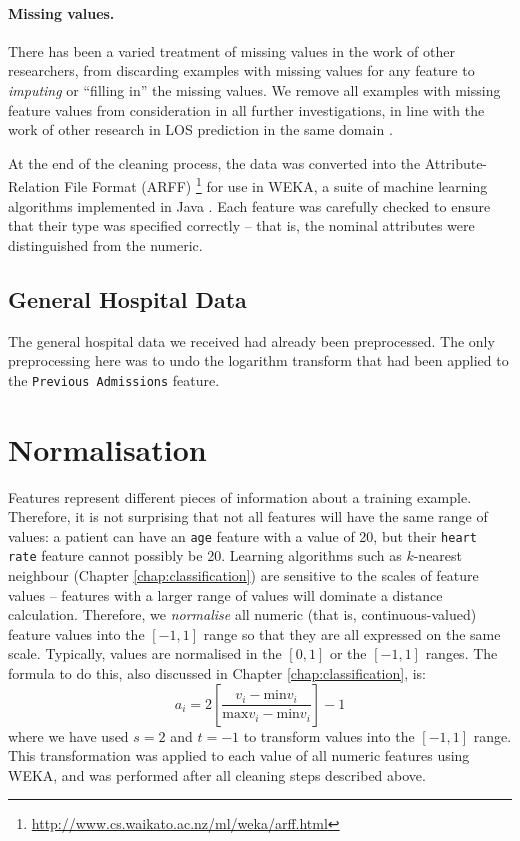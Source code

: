 \paragraph{Missing values.}
There has been a varied treatment of missing values in the work of other
researchers, from discarding examples with missing values for any feature
to \textit{imputing} or ``filling in'' the missing values. We remove all
examples with missing feature values from consideration in all further
investigations, in line with the work of other research in LOS prediction
in the same domain \cite{Dinh2013a}.

At the end of the cleaning process, the data was converted into the
Attribute-Relation File Format (ARFF)
\footnote{\url{http://www.cs.waikato.ac.nz/ml/weka/arff.html}} for use in
WEKA, a suite of machine learning algorithms implemented in Java
\cite{Hall2009}. Each feature was carefully checked to ensure that their
type was specified correctly -- that is, the nominal attributes were
distinguished from the numeric.

\subsection{General Hospital Data}
The general hospital data we received had already been preprocessed. The only
preprocessing here was to
undo the logarithm transform that had been applied to the \texttt{Previous
Admissions} feature.

\section{Normalisation}
Features represent different pieces of information about a training example.
Therefore, it is not surprising that not all features will have the same range
of values: a patient can have an \texttt{age} feature with a value of 20, but
their \texttt{heart rate} feature cannot possibly be 20. Learning algorithms
such as $k$-nearest neighbour (Chapter \ref{chap:classification})
are sensitive to the scales of feature values -- features with a larger range
of values will dominate a distance calculation. Therefore, we
\textit{normalise} all numeric (that is, continuous-valued)
feature values into the $[-1,1]$ range so that they are all expressed on the
same scale. Typically, values are normalised in the $[0,1]$ or the $[-1,1]$
ranges.
The formula to do this, also discussed in Chapter \ref{chap:classification},
is:
\begin{equation*}
a_i = 2\left[\dfrac{v_i - \mathrm{min }v_i}{\mathrm{max }v_i - \mathrm{min }v_i}\right] - 1
\end{equation*}
where we have used $s=2$ and $t=-1$ to transform values into the $[-1,1]$
range. This transformation was applied to each value of all numeric features
using WEKA, and was performed after all cleaning steps described above.

